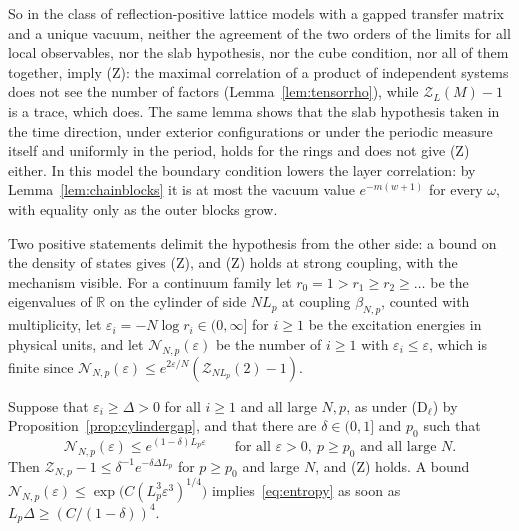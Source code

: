 So in the class of reflection-positive lattice models with a gapped
transfer matrix and a unique vacuum, neither the agreement of the two
orders of the limits for all local observables, nor the slab hypothesis,
nor the cube condition, nor all of them together, imply (Z): the maximal correlation of a product of independent
systems does not see the number of factors
(Lemma~\ref{lem:tensorrho}), while $\mathcal Z_L(M)-1$ is a trace, which
does. The same lemma shows that the slab hypothesis taken in the time
direction, under exterior configurations or under the periodic measure
itself and uniformly in the period, holds for the rings and does not give
(Z) either. In this model the boundary condition lowers the layer
correlation: by Lemma~\ref{lem:chainblocks} it is at most the vacuum value
$e^{-m(w+1)}$ for every $\omega$, with equality only as the outer blocks
grow.

Two positive statements delimit the hypothesis from the other side: a
bound on the density of states gives (Z), and (Z) holds at strong coupling,
with the mechanism visible. For a continuum family let
$r_0=1>r_1\ge r_2\ge\dots$ be the eigenvalues of $\mathbb R$ on the cylinder
of side $NL_p$ at coupling $\beta_{N,p}$, counted with multiplicity, let
$\varepsilon_i=-N\log r_i\in(0,\infty]$ for $i\ge1$ be the excitation
energies in physical units, and let $\mathcal N_{N,p}(\varepsilon)$ be the
number of $i\ge1$ with $\varepsilon_i\le\varepsilon$, which is finite since
$\mathcal N_{N,p}(\varepsilon)\le e^{2\varepsilon/N}(\mathcal Z_{NL_p}(2)-1)$.

\begin{proposition}
\label{prop:entropyZ}
Suppose that $\varepsilon_i\ge\Delta>0$ for all $i\ge1$ and all large $N,p$,
as under \textup{(D$_\ell$)} by Proposition~\textup{\ref{prop:cylindergap}},
and that there are $\delta\in(0,1]$ and $p_0$ such that
\begin{equation}\label{eq:entropy}
\mathcal N_{N,p}(\varepsilon)\le e^{(1-\delta)L_p\varepsilon}\qquad
\text{for all }\varepsilon>0,\ p\ge p_0\text{ and all large }N.
\end{equation}
Then $\mathcal Z_{N,p}-1\le\delta^{-1}e^{-\delta\Delta L_p}$ for $p\ge p_0$
and large $N$, and \textup{(Z)} holds. A bound $\mathcal N_{N,p}(\varepsilon)
\le\exp\bigl(C(L_p^3\varepsilon^3)^{1/4}\bigr)$ implies~\eqref{eq:entropy}
as soon as $L_p\Delta\ge(C/(1-\delta))^4$.
\end{proposition}

